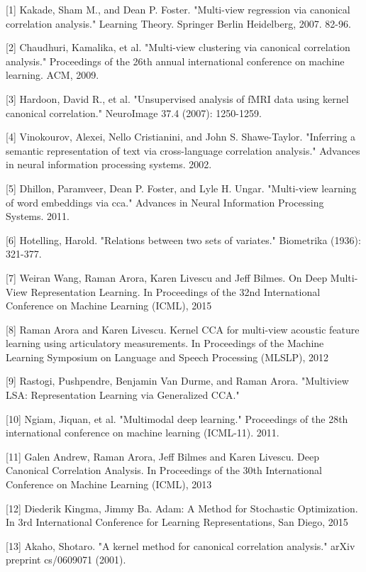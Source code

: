 \documentclass{article} %
\begin{document}
\small{

[1] Kakade, Sham M., and Dean P. Foster. "Multi-view regression via canonical correlation analysis." Learning Theory. Springer Berlin Heidelberg, 2007. 82-96.

[2] Chaudhuri, Kamalika, et al. "Multi-view clustering via canonical correlation analysis." Proceedings of the 26th annual international conference on machine learning. ACM, 2009.

[3] Hardoon, David R., et al. "Unsupervised analysis of fMRI data using kernel canonical correlation." NeuroImage 37.4 (2007): 1250-1259.

[4] Vinokourov, Alexei, Nello Cristianini, and John S. Shawe-Taylor. "Inferring a semantic representation of text via cross-language correlation analysis." Advances in neural information processing systems. 2002.

[5] Dhillon, Paramveer, Dean P. Foster, and Lyle H. Ungar. "Multi-view learning of word embeddings via cca." Advances in Neural Information Processing Systems. 2011.

[6] Hotelling, Harold. "Relations between two sets of variates." Biometrika (1936): 321-377.

[7] Weiran Wang, Raman Arora, Karen Livescu and Jeff Bilmes. On Deep Multi-View Representation Learning. In Proceedings of the 32nd International Conference on Machine Learning (ICML), 2015

[8] Raman Arora and Karen Livescu. Kernel CCA for multi-view acoustic feature learning using articulatory measurements. In Proceedings of the Machine Learning Symposium on Language and Speech Processing (MLSLP), 2012

[9] Rastogi, Pushpendre, Benjamin Van Durme, and Raman Arora. "Multiview LSA: Representation Learning via Generalized CCA."

[10] Ngiam, Jiquan, et al. "Multimodal deep learning." Proceedings of the 28th international conference on machine learning (ICML-11). 2011.

[11] Galen Andrew, Raman Arora, Jeff Bilmes and Karen Livescu. Deep Canonical Correlation Analysis. In Proceedings of the 30th International Conference on Machine Learning (ICML), 2013

[12] Diederik Kingma, Jimmy Ba. Adam: A Method for Stochastic Optimization. In 3rd International Conference for Learning Representations, San Diego, 2015

[13] Akaho, Shotaro. "A kernel method for canonical correlation analysis." arXiv preprint cs/0609071 (2001).




}
\end{document}
